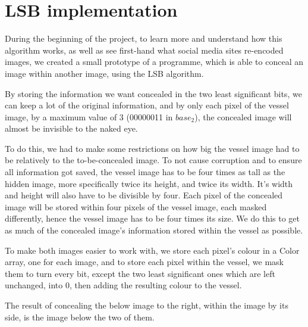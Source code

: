 \section{LSB implementation}
During the beginning of the project, to learn more and understand how this algorithm works, as well as see first-hand what social media sites re-encoded images, we created a small prototype of a programme, which is able to conceal an image within another image, using the LSB algorithm. 

By storing the information we want concealed in the two least significant bits, we can keep a lot of the original information, and by only each pixel of the vessel image, by a maximum value of 3 (00000011 in $base_2$), the concealed image will almost be invisible to the naked eye.

To do this, we had to make some restrictions on how big the vessel image had to be relatively to the to-be-concealed image. To not cause corruption and to ensure all information got saved, the vessel image has to be four times as tall as the hidden image, more specifically twice its height, and twice its width. It's width and height will also have to be divisible by four. Each pixel of the concealed image will be stored within four pixels of the vessel image, each masked differently, hence the vessel image has to be four times its size. We do this to get as much of the concealed image's information stored within the vessel as possible.

To make both images easier to work with, we store each pixel's colour in a Color array, one for each image, and to store each pixel within the vessel, we mask them to turn every bit, except the two least significant ones which are left unchanged, into 0, then adding the resulting colour to the vessel.

The result of concealing the below image to the right, within the image by its side, is the image below the two of them.

